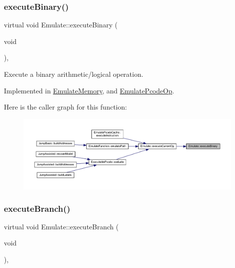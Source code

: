 \subsubsection{\texorpdfstring{executeBinary()}{executeBinary()}}
{\footnotesize\ttfamily virtual void Emulate\+::execute\+Binary (\begin{DoxyParamCaption}\item[{void}]{ }\end{DoxyParamCaption})\hspace{0.3cm}{\ttfamily [protected]}, {}}



Execute a binary arithmetic/logical operation. 



Implemented in \mbox{\hyperlink{class_emulate_memory_a1570bf6221f1d26978873823f94ce469}{Emulate\+Memory}}, and \mbox{\hyperlink{class_emulate_pcode_op_ac33f956b6cf8b205b32324d0a84b38cb}{Emulate\+Pcode\+Op}}.

Here is the caller graph for this function\+:
\nopagebreak
\begin{figure}[H]
\begin{center}
\leavevmode
\includegraphics[width=350pt]{class_emulate_a278171740465666a64442716187a1505_icgraph}
\end{center}
\end{figure}
\mbox{\label{class_emulate_a145cee350a9273250a970c9387ecbd81}} 
\subsubsection{\texorpdfstring{executeBranch()}{executeBranch()}}
{\footnotesize\ttfamily virtual void Emulate\+::execute\+Branch (\begin{DoxyParamCaption}\item[{void}]{ }\end{DoxyParamCaption})\hspace{0.3cm}{\ttfamily [protected]}, {}}



